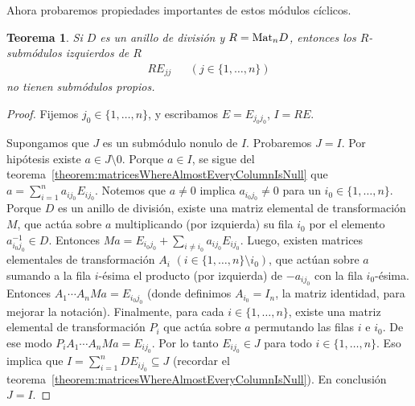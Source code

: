 \documentclass{report}
\newcommand{\Mat}{\textnormal{Mat}}
\newtheorem{theorem}{Teorema}
\begin{document}
  Ahora probaremos propiedades importantes de estos módulos cíclicos.

  \begin{theorem}
    Si \(D\) es un anillo de división y \(R = \Mat_n D\),
    entonces los \(R\)-submódulos izquierdos de \(R\)
    \begin{align}
      R E_{j j}
      &&(j \in \{1, \dots, n\})
    \end{align}
    no tienen submódulos propios.
  \end{theorem}
  \begin{proof}
    Fijemos \(j_0 \in \{1, \dots, n\}\), y escribamos \(E = E_{j_0 j_0}\), \(I = R E\).

    Supongamos que \(J\) es un submódulo nonulo de \(I\).
    Probaremos \(J = I\).
    Por hipótesis existe \(a \in J \setminus 0\).
    Porque \(a \in I\), se sigue del teorema~\ref{theorem:matricesWhereAlmostEveryColumnIsNull} que \(a = \sum_{i = 1}^n a_{i j_0} E_{i j_0}\).
    Notemos que \(a \neq 0\) implica \(a_{i_0 j_0} \neq 0\) para un \(i_0 \in \{1, \dots, n\}\).
    Porque \(D\) es un anillo de división, existe una matriz elemental de transformación \(M\), que actúa sobre \(a\) multiplicando (por izquierda) su fila \(i_0\) por el elemento \(a_{i_0 j_0}^{- 1} \in D\).
    Entonces \(M a = E_{i_0 j_0} + \sum_{i \neq i_0} a_{i j_0} E_{i j_0}\).
    Luego, existen matrices elementales de transformación \(A_i\) \((i \in \{1, \dots, n\} \setminus i_0)\), que actúan sobre \(a\) sumando a la fila \(i\)-ésima el producto (por izquierda) de \(- a_{i j_0}\) con la fila \(i_0\)-ésima.
    Entonces \(A_1 \cdots A_n M a = E_{i_0 j_0}\) (donde definimos \(A_{i_0} = I_n\), la matriz identidad, para mejorar la notación).
    Finalmente, para cada \(i \in \{1, \dots, n\}\), existe una matriz elemental de transformación \(P_i\) que actúa sobre \(a\) permutando las filas \(i\) e \(i_0\).
    De ese modo \(P_i A_1 \cdots A_n M a = E_{i j_0}\).
    Por lo tanto \(E_{i j_0} \in J\) para todo \(i \in \{1, \dots, n\}\).
    Eso implica que \(I = \sum_{i = 1}^n D E_{i j_0} \subseteq J\) (recordar el teorema~\ref{theorem:matricesWhereAlmostEveryColumnIsNull}).
    En conclusión \(J = I\).
  \end{proof}
\end{document}

